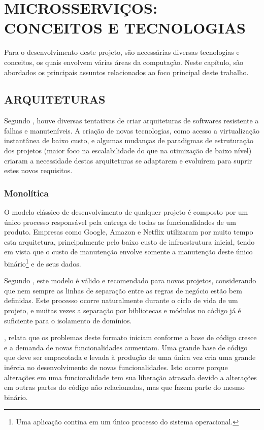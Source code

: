 \chapter{MICROSSERVIÇOS: CONCEITOS E TECNOLOGIAS}
\label{chp:tecnologias}

Para o desenvolvimento deste projeto, são necessárias diversas tecnologias e
conceitos, os quais envolvem várias áreas da computação. Neste capítulo, são
abordados os principais assuntos relacionados ao foco principal deste trabalho.

\section{ARQUITETURAS}

Segundo , houve diversas tentativas de criar
arquiteturas de softwares resistente a falhas e manuteníveis. A criação de
novas tecnologias, como acesso a virtualização instantânea de baixo custo,
e algumas mudanças de paradigmas de estruturação dos projetos (maior foco
na escalabilidade do que na otimização de baixo nível) criaram a
necessidade destas arquiteturas se adaptarem e evoluírem para suprir estes
novos requisitos.

\subsection{Monolítica}

O modelo clássico de desenvolvimento de qualquer projeto é composto por um
único processo responsável pela entrega de todas as funcionalidades de um
produto. Empresas como Google, Amazon e Netflix utilizaram por muito tempo
esta arquitetura, principalmente pelo baixo custo de infraestrutura inicial,
tendo em vista que o custo de manutenção envolve somente a manutenção deste
único binário\footnote{Uma aplicação contina em um único processo do
sistema operacional.} e de seus dados.

Segundo , este modelo é válido e recomendado para novos
projetos, considerando que nem sempre as linhas de separação entre as regras
de negócio estão bem definidas. Este processo ocorre naturalmente durante o
ciclo de vida de um projeto, e muitas vezes a separação por bibliotecas e
módulos no código já é suficiente para o isolamento de domínios.

, relata que os problemas deste formato iniciam conforme
a base de código cresce e a demanda de novas funcionalidades aumentam. Uma
grande base de código que deve ser empacotada e levada à produção de uma
única vez cria uma grande inércia no desenvolvimento de novas
funcionalidades. Isto ocorre porque alterações em uma funcionalidade tem
sua liberação atrasada devido a alterações em outras partes do código não
relacionadas, mas que fazem parte do mesmo binário.


